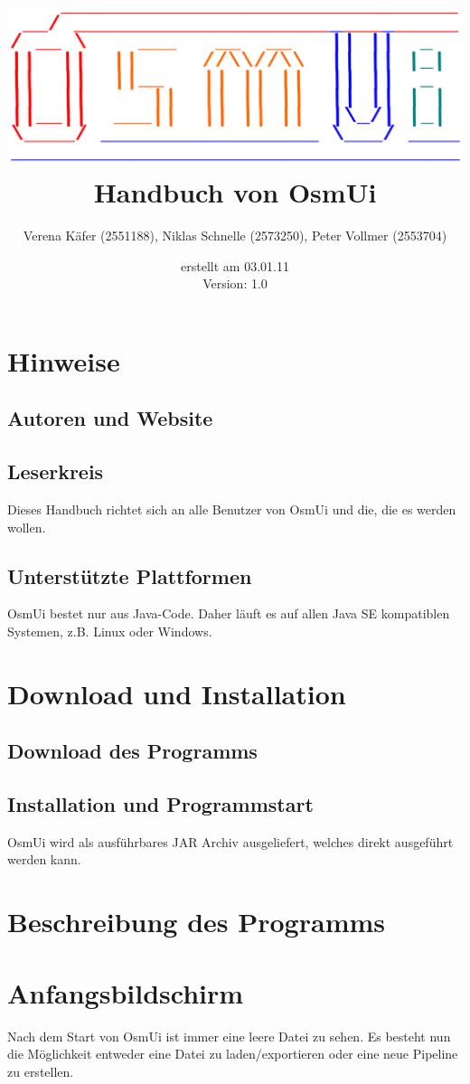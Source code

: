 \documentclass[a4paper,10pt]{scrartcl}
\author{Verena Käfer (2551188), Niklas Schnelle (2573250), Peter Vollmer (2553704)}
\date{erstellt am 03.01.11\\
Version: 1.0}
\title{\includegraphics[width=15cm]{../projektplan/Logo_Osmui.png} \\ 
Handbuch von OsmUi}
\begin{document}
\maketitle
\newpage
\tableofcontents
\newpage

\section{Hinweise}
\subsection{Autoren und Website}
\subsection{Leserkreis}
Dieses Handbuch richtet sich an alle Benutzer von OsmUi und die, die es werden wollen.
\subsection{Unterstützte Plattformen}
OsmUi bestet nur aus Java-Code. Daher läuft es auf allen Java SE kompatiblen Systemen, z.B. Linux oder Windows.


\section{Download und Installation}
\subsection{Download des Programms}
\subsection{Installation und Programmstart}
OsmUi wird als ausführbares JAR Archiv ausgeliefert, welches direkt ausgeführt werden kann. 

\section{Beschreibung des Programms}

\section{Anfangsbildschirm}
Nach dem Start von OsmUi ist immer eine leere Datei zu sehen. Es besteht nun die Möglichkeit entweder eine Datei zu laden/exportieren oder eine neue Pipeline zu erstellen.
\end{document}
